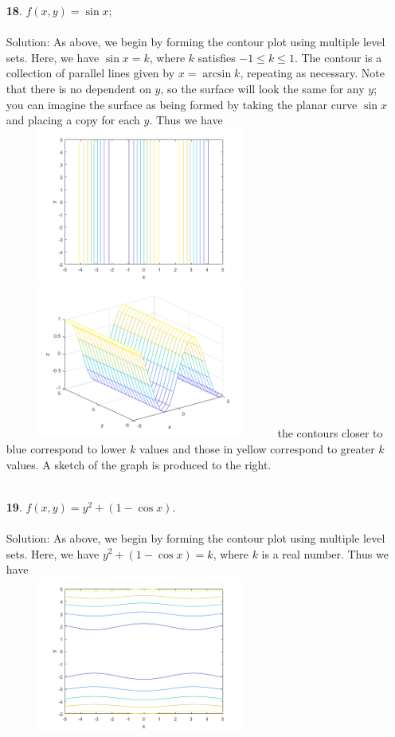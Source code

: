 \documentclass[12pt]{amsbook}
\begin{document}
\begin{enumerate}
  \\
  \\
  \item[{\small\bf 18}.] $f(x,y)=\sin x$;
  \\
  \\
  {\sc Solution}: As above, we begin by forming the contour plot using multiple level sets. Here, we have $\sin x=k$, where $k$ satisfies $-1 \leq k \leq 1$. The contour is a collection of parallel lines given by $x=\arcsin k$, repeating as necessary. Note that there is no dependent on $y$, so the surface will look the same for any $y$; you can imagine the surface as being formed by taking the planar curve $\sin x$ and placing a copy for each $y$. Thus we have
  \\
  \includegraphics[width=3.5in,height=2.0in]{3_1_18_1.png}
  \includegraphics[width=3.5in,height=2.0in]{3_1_18_2.png}
  the contours closer to blue correspond to lower $k$ values and those in yellow correspond to greater $k$ values. A sketch of the graph is produced to the right.
  \\
  \\
  \item[{\small\bf 19}.] $f(x,y)=y^2+(1-\cos x)$.
  \\
  \\
  {\sc Solution}: As above, we begin by forming the contour plot using multiple level sets. Here, we have $y^2+(1-\cos x)=k$, where $k$ is a real number.  Thus we have
  \\
  \includegraphics[width=3.5in,height=2.0in]{3_1_19_1.png}

\end{enumerate}
\end{document}
